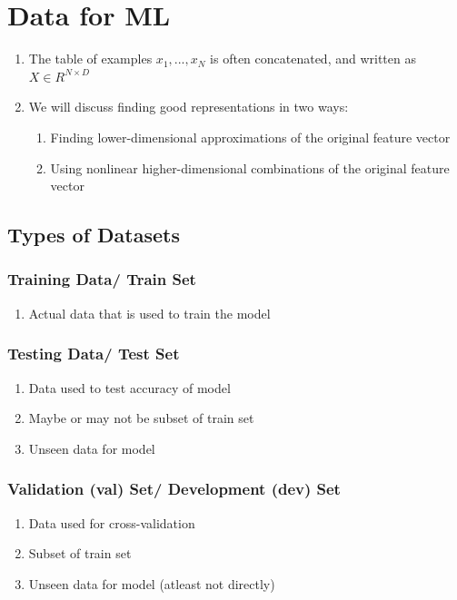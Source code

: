 \chapter{Data for ML}

\begin{enumerate}
    \item The table of examples ${x_1, ..., x_N}$ is often concatenated, and written as $X \in R^{N \times D}$
    \item We will discuss finding good representations in two ways:
    \begin{enumerate}
        \item Finding lower-dimensional approximations of the original feature vector
        \item Using nonlinear higher-dimensional combinations of the original feature vector
    \end{enumerate}
\end{enumerate}


\section{Types of Datasets}\label{Types of Datasets}

\subsection{Training Data/ Train Set}\label{Training Data/ Train Set}
\begin{enumerate}
    \item Actual data that is used to train the model
\end{enumerate}

\subsection{Testing Data/ Test Set}\label{Testing Data/ Test Set}
\begin{enumerate}
    \item Data used to test accuracy of model
    \item Maybe or may not be subset of train set
    \item Unseen data for model
\end{enumerate}

\subsection{Validation (val) Set/ Development (dev) Set}\label{Validation (val) Set/ Development (dev) Set}
\begin{enumerate}
    \item Data used for cross-validation
    \item Subset of train set
    \item Unseen data for model (atleast not directly)
\end{enumerate}

